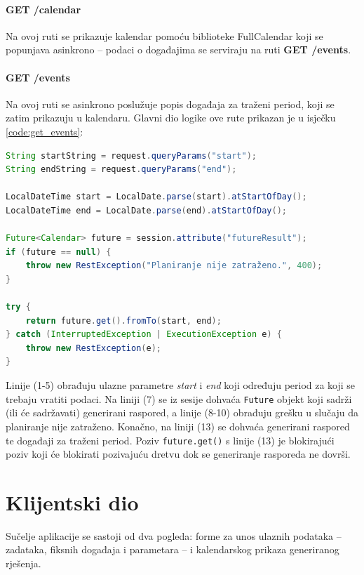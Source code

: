 \documentclass[times, utf8, zavrsni]{fer}
\begin{document}
\paragraph{GET /calendar} Na ovoj ruti se prikazuje kalendar pomoću biblioteke FullCalendar koji se popunjava asinkrono -- podaci o događajima se serviraju na ruti \textbf{GET /events}.

\paragraph{GET /events} Na ovoj ruti se asinkrono poslužuje popis događaja za traženi period, koji se zatim prikazuju u kalendaru. Glavni dio logike ove rute prikazan je u isječku \ref{code:get_events}:

\begin{lstlisting}[language=java, caption=Ruta \textbf{GET /events}, label={code:get_events}, mathescape]
String startString = request.queryParams("start");
String endString = request.queryParams("end");

LocalDateTime start = LocalDate.parse(start).atStartOfDay();
LocalDateTime end = LocalDate.parse(end).atStartOfDay();

Future<Calendar> future = session.attribute("futureResult");
if (future == null) {
    throw new RestException("Planiranje nije zatraženo.", 400);
}

try {
    return future.get().fromTo(start, end);
} catch (InterruptedException | ExecutionException e) {
    throw new RestException(e);
}
\end{lstlisting}

Linije (1-5) obrađuju ulazne parametre \textit{start} i \textit{end} koji određuju period za koji se trebaju vratiti podaci. Na liniji (7) se iz sesije dohvaća \texttt{Future} objekt koji sadrži (ili će sadržavati) generirani raspored, a linije (8-10) obrađuju grešku u slučaju da planiranje nije zatraženo. Konačno, na liniji (13) se dohvaća generirani raspored te događaji za traženi period. Poziv \texttt{future.get()} s linije (13) je blokirajući poziv koji će blokirati pozivajuću dretvu dok se generiranje rasporeda ne dovrši.

\section{Klijentski dio}
Sučelje aplikacije se sastoji od dva pogleda: forme za unos ulaznih podataka -- zadataka, fiksnih događaja i parametara -- i kalendarskog prikaza generiranog rješenja.
\end{document}
